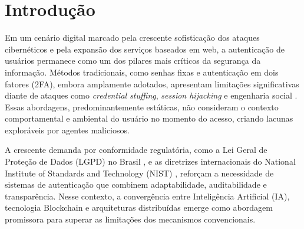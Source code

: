 \documentclass[12pt]{article}
\begin{document}
\begin{abstract}
This paper presents the development and evaluation of an autonomous contextual authentication system integrating Artificial Intelligence (AI) and Blockchain technology to enhance access security in web applications. The proposed architecture is based on microservices and comprises five functional layers: modular application, continuous integration, automated security, artificial intelligence, and immutable logging. The AI module employs an ensemble model (Random Forest, Decision Tree, and Logistic Regression) for real-time risk classification, analyzing ten contextual attributes --- including geolocation, device, time, and user behavioral patterns. The Blockchain layer ensures immutability and forensic traceability of authentication logs, meeting regulatory requirements such as Brazil's LGPD. Experimental results demonstrate 91\% accuracy in anomalous access detection, with an average latency of 320ms and 100\% integrity in Blockchain-recorded transactions.
\end{abstract}

\section{Introdução}

Em um cenário digital marcado pela crescente sofisticação dos ataques cibernéticos e pela expansão dos serviços baseados em web, a autenticação de usuários permanece como um dos pilares mais críticos da segurança da informação. Métodos tradicionais, como senhas fixas e autenticação em dois fatores (2FA), embora amplamente adotados, apresentam limitações significativas diante de ataques como \textit{credential stuffing}, \textit{session hijacking} e engenharia social \cite{owasp2023}. Essas abordagens, predominantemente estáticas, não consideram o contexto comportamental e ambiental do usuário no momento do acesso, criando lacunas exploráveis por agentes maliciosos.

A crescente demanda por conformidade regulatória, como a Lei Geral de Proteção de Dados (LGPD) no Brasil \cite{brasil2018}, e as diretrizes internacionais do National Institute of Standards and Technology (NIST) \cite{nist2020}, reforçam a necessidade de sistemas de autenticação que combinem adaptabilidade, auditabilidade e transparência. Nesse contexto, a convergência entre Inteligência Artificial (IA), tecnologia Blockchain e arquiteturas distribuídas emerge como abordagem promissora para superar as limitações dos mecanismos convencionais.
\end{document}
